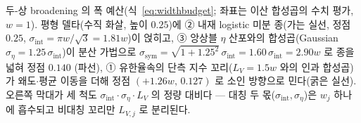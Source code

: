 \caption{두-상 broadening 의 폭 예산(식~\eqref{eq:widthbudget}; 좌표는 이산 합성곱의 수치 평가, $w{=}1$).
평형 델타(수직 화살, 높이 $0.25$)에 ② 내재 logistic 미분 종(가는 실선, 정점 $0.25$, $\sigma_\mathrm{int}{=}\pi w/\sqrt3{=}1.81w$)이
얹히고, ③ 앙상블 $\eta$ 산포와의 합성곱(Gaussian $\sigma_\eta{=}1.25\,\sigma_\mathrm{int}$)이 분산 가법으로
$\sigma_\mathrm{sym}{=}\sqrt{1{+}1.25^2}\,\sigma_\mathrm{int}{=}1.60\,\sigma_\mathrm{int}{=}2.90w$ 로 종을 넓혀 정점 $0.140$
(파선), ① 유한율속의 단측 지수 꼬리($L_V{=}1.5w$ 와의 인과 합성곱)가 왜도$\cdot$평균 이동을 더해 정점
$(+1.26w,\,0.127)$ 로 소인 방향으로 민다(굵은 실선). 오른쪽 막대가 세 척도 $\sigma_\mathrm{int}\cdot\sigma_\eta\cdot L_V$ 의
정량 대비다 --- 대칭 두 몫($\sigma_\mathrm{int},\sigma_\eta$)은 $w_j$ 하나에 흡수되고 비대칭 꼬리만 $L_{V,j}$ 로 분리된다.}
\label{fig:widthbudget}
